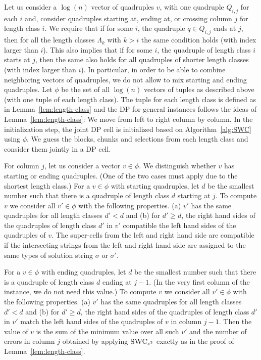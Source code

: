 Let us consider a $\log(n)$ vector of quadruples $v$, with one quadruple $Q_{i,j}$ for each $i$ and, consider quadruples starting at, ending at, or crossing column $j$ for length class $i$.
We require that if for some $i$, the quadruple $q \in Q_{i,j}$ ends at $j$, then for all the length classes $\Lambda_k$ with $k>i$ the same condition holds (with index larger than $i$).
This also implies that if for some $i$, the quadruple of length class $i$ starts at $j$, then the same also holds for all quadruples of shorter length classes (with index larger than $i$).
In particular, in order to be able to combine neighboring vectors of quadruples, we do not allow to mix starting and ending quadruples.
Let $\phi$ be the set of all $\log(n)$ vectors of tuples as described above (with one tuple of each length class).
The tuple for each length class is defined as in Lemma~\ref{lem:length-class} and the DP for general instances follows the ideas of Lemma~\ref{lem:length-class}:
We move from left to right column by column. In the initialization step, the joint DP cell is initialized based on Algorithm~\ref{alg:SWC} using $\phi$.
We guess the blocks, chunks and selections from each length class and consider them jointly in a DP cell.

For column $j$, let us consider a vector $v \in \phi$.
We distinguish whether $v$ has starting or ending quadruples. 
(One of the two cases must apply due to the shortest length class.)
For a $v \in \phi$ with starting quadruples,
let $d$ be the smallest number such that there is a quadruple of length class $d$ starting at $j$.
To compute $v$ we consider all $v' \in \phi$ with the following properties.
(a) $v'$ has the same quadruples for all length classes $d' < d$ and 
(b) for $d' \ge d$, the right hand sides of the quadruples of length class $d'$ in $v'$ compatible the left hand sides of the quadruples of $v$.
The super-cells from the left and right hand side are compatible if the intersecting strings from the left and right hand side are assigned to the same types of solution string $\sigma$ or $\sigma'$.

For a $v \in \phi$ with ending quadruples,
let $d$ be the smallest number such that there is a quadruple of length class $d$ ending at $j-1$. (In the very first column of the instance, we do not need this value.)
To compute $v$ we consider all $v' \in \phi$ with the following properties.
(a) $v'$ has the same quadruples for all length classes $d' < d$ and 
(b) for $d' \ge d$, the right hand sides of the quadruples of length class $d'$ in $v'$ match the left hand sides of the quadruples of $v$ in column $j-1$.
Then the value of $v$ is the sum of the minimum value over all such $v'$ and the number of errors in column $j$ obtained by applying $\textsc{SWC}_{\varepsilon^3}$ exactly as in the proof of Lemma~\ref{lem:length-class}. 

